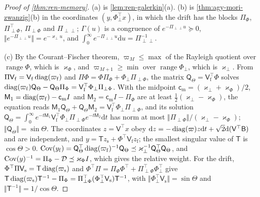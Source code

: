 \begin{proof}[Proof of \cref{thm:ren-memory}]
(a) is \cref{lem:ren-galerkin}(a). (b) is \cref{thm:agy-mori-zwanzig}(b) in the coordinates $(y,\Phi_\perp^\top x)$, in which the drift has the blocks $\Pi_\Phi$, $\Pi_{\perp\Phi}^\top$, $\Pi_{\perp\Phi}$ and $\Pi_{\perp\perp}$; $\Gamma(u)$ is a congruence of $e^{-\Pi_{\perp\perp}u}\succeq0$, $\Vert e^{-\Pi_{\perp\perp}u}\Vert=e^{-\varkappa_\perp u}$, and $\int_0^\infty e^{-\Pi_{\perp\perp}u}\mathrm du=\Pi_{\perp\perp}^{-1}$.

(c) By the Courant--Fischer theorem, $\varpi_M\le\max$ of the Rayleigh quotient over $\operatorname{range}\Phi$, which is $\varkappa_\Phi$, and $\varpi_{M+1}\ge\min$ over $\operatorname{range}\Phi_\perp$, which is $\varkappa_\perp$. From $\Pi\mathsf V_{\mathrm f}=\mathsf V_{\mathrm f}\operatorname{diag}(\varpi_{\mathrm f})$ and $\Pi\Phi=\Phi\Pi_\Phi+\Phi_\perp\Pi_{\perp\Phi}$, the matrix $\mathsf Q_\Theta=\mathsf V_{\mathrm f}^\top\Phi$ solves $\operatorname{diag}(\varpi_{\mathrm f})\mathsf Q_\Theta-\mathsf Q_\Theta\Pi_\Phi=\mathsf V_{\mathrm f}^\top\Phi_\perp\Pi_{\perp\Phi}$. With the midpoint $\mathsf c_{\mathrm m}=(\varkappa_\perp+\varkappa_\Phi)/2$, $\mathsf M_1=\operatorname{diag}(\varpi_{\mathrm f})-\mathsf c_{\mathrm m}I$ and $\mathsf M_2=\mathsf c_{\mathrm m}I-\Pi_\Phi$ are at least $\frac12(\varkappa_\perp-\varkappa_\Phi)$, the equation reads $\mathsf M_1\mathsf Q_\Theta+\mathsf Q_\Theta\mathsf M_2=\mathsf V_{\mathrm f}^\top\Phi_\perp\Pi_{\perp\Phi}$, and its solution $\mathsf Q_\Theta=\int_0^\infty e^{-t\mathsf M_1}\mathsf V_{\mathrm f}^\top\Phi_\perp\Pi_{\perp\Phi}e^{-t\mathsf M_2}\mathrm dt$ has norm at most $\Vert\Pi_{\perp\Phi}\Vert/(\varkappa_\perp-\varkappa_\Phi)$; $\Vert\mathsf Q_\Theta\Vert=\sin\Theta$. The coordinates $z=\mathsf V^\top x$ obey $\mathrm dz=-\operatorname{diag}(\varpi)z\mathrm dt+\sqrt2\mathrm d(\mathsf V^\top\mathsf B)$ and are independent, and $y=\mathsf Tz_{\mathrm s}+\Phi^\top\mathsf V_{\mathrm f}z_{\mathrm f}$; the smallest singular value of $\mathsf T$ is $\cos\Theta>0$. $\operatorname{Cov}(y_{\mathrm f})=\mathsf Q_\Theta^\top\operatorname{diag}(\varpi_{\mathrm f})^{-1}\mathsf Q_\Theta\preceq\varkappa_\perp^{-1}\mathsf Q_\Theta^\top\mathsf Q_\Theta$, and $\operatorname{Cov}(y)^{-1}=\Pi_\Phi-\mathcal D\preceq\varkappa_\Phi I$, which gives the relative weight. For the drift, $\Phi^\top\Pi\mathsf V_{\mathrm s}=\mathsf T\operatorname{diag}(\varpi_{\mathrm s})$ and $\Phi^\top\Pi=\Pi_\Phi\Phi^\top+\Pi_{\perp\Phi}^\top\Phi_\perp^\top$ give $\mathsf T\operatorname{diag}(\varpi_{\mathrm s})\mathsf T^{-1}-\Pi_\Phi=\Pi_{\perp\Phi}^\top(\Phi_\perp^\top\mathsf V_{\mathrm s})\mathsf T^{-1}$, with $\Vert\Phi_\perp^\top\mathsf V_{\mathrm s}\Vert=\sin\Theta$ and $\Vert\mathsf T^{-1}\Vert=1/\cos\Theta$.


\end{proof}
